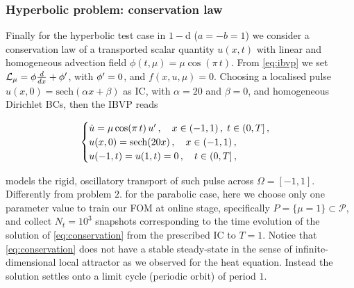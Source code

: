\documentclass[../main.tex]{subfiles}
\begin{document}
\subsubsection{Hyperbolic problem: conservation law}\label{subsubsec:conservation}

Finally for the hyperbolic test case in $1-$d ($a= -b = 1$) we consider a conservation law of a transported scalar quantity $u(x,t)$ with linear and homogeneous advection field $\phi(t,\mu) = \mu\cos(\pi\,t)$.
From \eqref{eq:ibvp} we set $\mathcal{L}_{\mu} = \phi\frac{d}{dx} + \phi'$, with $\phi' = 0$, and $f(x,u,\mu) = 0$.
Choosing a localised pulse $u(x,0) = \text{sech}(\alpha x + \beta)$ as IC, with $\alpha=20$ and $\beta=0$, and homogeneous Dirichlet BCs, then the IBVP reads

\begin{equation}\label{eq:conservation}
   \begin{cases}
           \dot{u} = \mu\cos(\pi\,t)\,u' \,,\quad x\in(-1,1)\,,\;t\in(0,T]\,, \\
           u(x,0) = \text{sech}(20x)\,, \quad x\in(-1,1)\,, \\
           u(-1,t) = u(1,t) = 0\,, \quad t\in(0,T]\,, \\
   \end{cases}
\end{equation}

models the rigid, oscillatory transport of such pulse across $\Omega=[-1,1]$.
Differently from problem $2.$ for the parabolic case, here we choose only one parameter value to train our FOM at online stage, specifically $P=\{\mu=1\}\subset \mathcal{P}$, and collect $N_{t}=10^{3}$ snapshots corresponding to the time evolution of the solution of \eqref{eq:conservation} from the prescribed IC to $T=1$.
Notice that \eqref{eq:conservation} does not have a stable steady-state in the sense of infinite-dimensional local attractor as we observed for the heat equation.
Instead the solution settles onto a limit cycle (periodic orbit) of period $1$.



\end{document}

